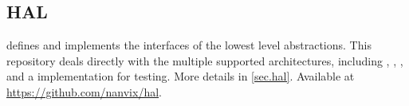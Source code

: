     \subsection{HAL}
    
        defines and implements the interfaces of the lowest level
        abstractions. This repository deals directly with the multiple
        supported architectures, including \mppa, \optimsoc, \hero, and a
        \unix implementation for testing. More details in \autoref{sec.hal}.
        Available at \url{https://github.com/nanvix/hal}.

